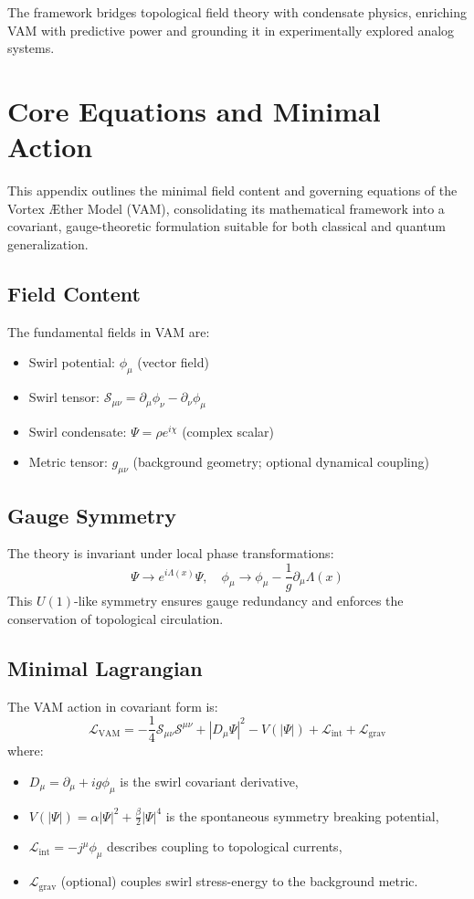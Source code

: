 The framework bridges topological field theory with condensate physics, enriching VAM with predictive power and grounding it in experimentally explored analog systems.

\section{Core Equations and Minimal Action}
This appendix outlines the minimal field content and governing equations of the Vortex Æther Model (VAM), consolidating its mathematical framework into a covariant, gauge-theoretic formulation suitable for both classical and quantum generalization.

\subsection{Field Content}
The fundamental fields in VAM are:
\begin{itemize}
    \item Swirl potential: $\phi_\mu$ (vector field)
    \item Swirl tensor: $\mathcal{S}_{\mu\nu} = \partial_\mu \phi_\nu - \partial_\nu \phi_\mu$
    \item Swirl condensate: $\Psi = \rho e^{i\chi}$ (complex scalar)
    \item Metric tensor: $g_{\mu\nu}$ (background geometry; optional dynamical coupling)
\end{itemize}

\subsection{Gauge Symmetry}
The theory is invariant under local phase transformations:
\begin{equation}
    \Psi \rightarrow e^{i\Lambda(x)} \Psi, \quad \phi_\mu \rightarrow \phi_\mu - \frac{1}{g} \partial_\mu \Lambda(x)
\end{equation}
This $U(1)$-like symmetry ensures gauge redundancy and enforces the conservation of topological circulation.

\subsection{Minimal Lagrangian}
The VAM action in covariant form is:
\begin{equation}
    \mathcal{L}_\text{VAM} = -\frac{1}{4} \mathcal{S}_{\mu\nu} \mathcal{S}^{\mu\nu} + |D_\mu \Psi|^2 - V(|\Psi|) + \mathcal{L}_{\text{int}} + \mathcal{L}_{\text{grav}}
\end{equation}
where:
\begin{itemize}
    \item $D_\mu = \partial_\mu + i g \phi_\mu$ is the swirl covariant derivative,
    \item $V(|\Psi|) = \alpha |\Psi|^2 + \frac{\beta}{2} |\Psi|^4$ is the spontaneous symmetry breaking potential,
    \item $\mathcal{L}_{\text{int}} = -j^\mu \phi_\mu$ describes coupling to topological currents,
    \item $\mathcal{L}_{\text{grav}}$ (optional) couples swirl stress-energy to the background metric.
\end{itemize}

